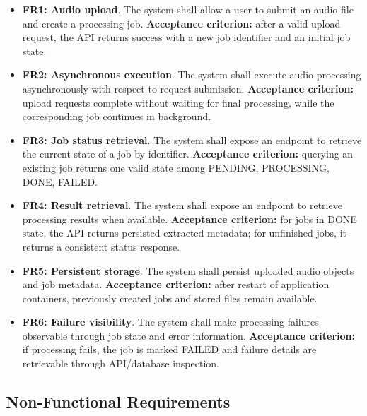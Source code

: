 \documentclass{scrartcl}
\begin{document}
\begin{itemize}
  \item \textbf{FR1: Audio upload}. The system shall allow a user to submit an audio file and create a processing job.
  \textbf{Acceptance criterion:} after a valid upload request, the API returns success with a new job identifier and an initial job state.

  \item \textbf{FR2: Asynchronous execution}. The system shall execute audio processing asynchronously with respect to request submission.
  \textbf{Acceptance criterion:} upload requests complete without waiting for final processing, while the corresponding job continues in background.

  \item \textbf{FR3: Job status retrieval}. The system shall expose an endpoint to retrieve the current state of a job by identifier.
  \textbf{Acceptance criterion:} querying an existing job returns one valid state among PENDING, PROCESSING, DONE, FAILED.

  \item \textbf{FR4: Result retrieval}. The system shall expose an endpoint to retrieve processing results when available.
  \textbf{Acceptance criterion:} for jobs in DONE state, the API returns persisted extracted metadata; for unfinished jobs, it returns a consistent status response.

  \item \textbf{FR5: Persistent storage}. The system shall persist uploaded audio objects and job metadata.
  \textbf{Acceptance criterion:} after restart of application containers, previously created jobs and stored files remain available.

  \item \textbf{FR6: Failure visibility}. The system shall make processing failures observable through job state and error information.
  \textbf{Acceptance criterion:} if processing fails, the job is marked FAILED and failure details are retrievable through API/database inspection.
\end{itemize}

\subsection*{Non-Functional Requirements}
\end{document}
